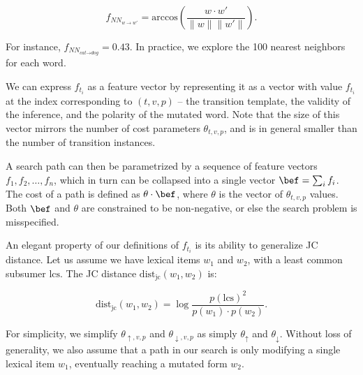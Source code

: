 \vspace{-0.5em}
\begin{equation*}
  f_{NN_{w \rightarrow w'}}
    = \textrm{arccos} \left( \frac{w \cdot w'}{\|w\| \|w'\|} \right).
\end{equation*}
\vspace{-0.5em}

For instance, $f_{NN_{\textit{cat} \rightarrow \textit{dog}}} = 0.43$.
In practice, we explore the 100 nearest neighbors for each word.

We can express $f_{t_i}$ as a feature vector by representing it as
  a vector with value $f_{t_i}$ at the index corresponding to
  $(t,v,p)$ -- the transition template, the validity of the inference,
  and the polarity of the mutated word.
Note that the size of this vector mirrors the number of cost
  parameters $\theta_{t,v,p}$, and is in general smaller than the
  number of transition instances.

A search path can then be parametrized by a sequence of feature vectors
  $f_1, f_2, \dots, f_n$, which in turn can be collapsed into a single
  vector $\bef = \sum_i f_i$.
The cost of a path is defined as $\theta \cdot \bef$, where
  $\theta$ is the vector of $\theta_{t,v,p}$ values.
Both $\bef$ and $\theta$ are constrained to be non-negative, or else
  the search problem is misspecified.


%
%
An elegant property of our definitions of $f_{t_i}$ is its ability to
  generalize JC distance.
Let us assume we have lexical items $w_1$ and $w_2$, with a least common 
  subsumer $\textrm{lcs}$.
The JC distance $\textrm{dist}_{\textrm{jc}}(w_1, w_2)$ is:

\vspace{-0.5em}
\begin{equation}
\textrm{dist}_{\textrm{jc}}(w_1, w_2)
  = \log\frac{p(\textrm{lcs})^2}{p(w_1) \cdot p(w_2)}.
\label{eqn:jc}
\end{equation}
\vspace{-0.5em}

For simplicity, we simplify $\theta_{\uparrow,v,p}$ and $\theta_{\downarrow,v,p}$
  as simply $\theta_\uparrow$ and $\theta_\downarrow$.
Without loss of generality, we also assume that a path in our search
  is only modifying a single lexical item $w_1$, eventually 
  reaching a mutated form $w_2$.

